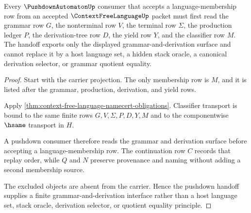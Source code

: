 \begin{theorem}
\label{thm:context-free-language-pushdown-handoff}
Every $\PushdownAutomatonUp$ consumer that accepts a language-membership row from an accepted $\ContextFreeLanguageUp$ packet must first read the grammar row $G$, the nonterminal row $V$, the terminal row $\Sigma$, the production ledger $P$, the derivation-tree row $D$, the yield row $Y$, and the classifier row $M$. The handoff exports only the displayed grammar-and-derivation surface and cannot replace it by a host language set, a hidden stack oracle, a canonical derivation selector, or grammar quotient equality.
\end{theorem}
\begin{proof}
Start with the carrier projection. The only membership row is $M$, and it is listed after the grammar, production, derivation, and yield rows.

Apply \autoref{thm:context-free-language-namecert-obligations}. Classifier transport is bound to the same finite rows $G,V,\Sigma,P,D,Y,M$ and to the componentwise $\hsame$ transport in $H$.

A pushdown consumer therefore reads the grammar and derivation surface before accepting a language-membership row. The continuation row $C$ records that replay order, while $Q$ and $N$ preserve provenance and naming without adding a second membership source.

The excluded objects are absent from the carrier. Hence the pushdown handoff supplies a finite grammar-and-derivation interface rather than a host language set, stack oracle, derivation selector, or quotient equality principle.
\end{proof}


\begin{closurestatus}{\ContextFreeLanguageUp}
  \theoryclosure{\seedClosure}
  \formalstatus{\unformalizedV}
\end{closurestatus}
